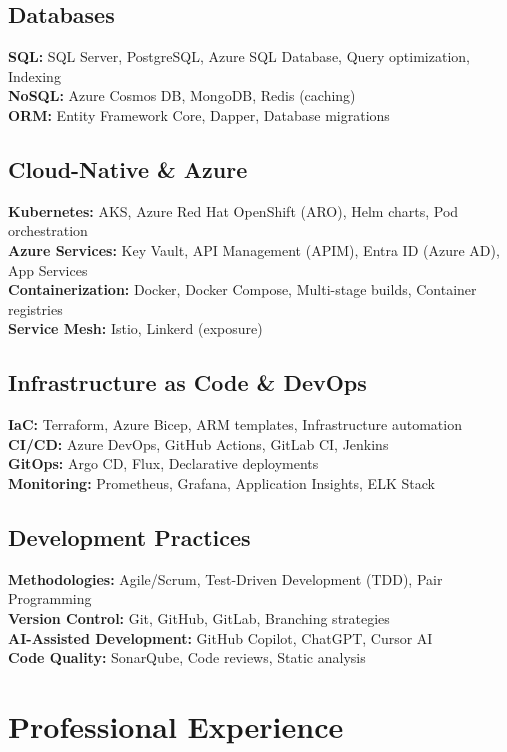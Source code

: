 \documentclass[10pt,a4paper]{article}
\begin{document}
\subsection*{Databases}
\textbf{SQL:} SQL Server, PostgreSQL, Azure SQL Database, Query optimization, Indexing\\
\textbf{NoSQL:} Azure Cosmos DB, MongoDB, Redis (caching)\\
\textbf{ORM:} Entity Framework Core, Dapper, Database migrations

\subsection*{Cloud-Native \& Azure}
\textbf{Kubernetes:} AKS, Azure Red Hat OpenShift (ARO), Helm charts, Pod orchestration\\
\textbf{Azure Services:} Key Vault, API Management (APIM), Entra ID (Azure AD), App Services\\
\textbf{Containerization:} Docker, Docker Compose, Multi-stage builds, Container registries\\
\textbf{Service Mesh:} Istio, Linkerd (exposure)

\subsection*{Infrastructure as Code \& DevOps}
\textbf{IaC:} Terraform, Azure Bicep, ARM templates, Infrastructure automation\\
\textbf{CI/CD:} Azure DevOps, GitHub Actions, GitLab CI, Jenkins\\
\textbf{GitOps:} Argo CD, Flux, Declarative deployments\\
\textbf{Monitoring:} Prometheus, Grafana, Application Insights, ELK Stack

\subsection*{Development Practices}
\textbf{Methodologies:} Agile/Scrum, Test-Driven Development (TDD), Pair Programming\\
\textbf{Version Control:} Git, GitHub, GitLab, Branching strategies\\
\textbf{AI-Assisted Development:} GitHub Copilot, ChatGPT, Cursor AI\\
\textbf{Code Quality:} SonarQube, Code reviews, Static analysis

\vspace{0.2cm}

\section*{Professional Experience}
\end{document}
